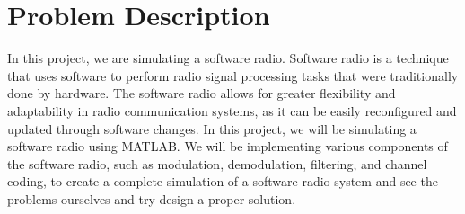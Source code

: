 \chapter[Problem Description]{Problem Description}
\label{cp:problem-description}
In this project, we are simulating a software radio. Software radio is a technique that uses software to perform radio signal processing tasks that were traditionally done by hardware. The software radio allows for greater flexibility and adaptability in radio communication systems, as it can be easily reconfigured and updated through software changes.
 In this project, we will be simulating a software radio using MATLAB.
 We will be implementing various components of the software radio, such as modulation, demodulation, filtering, and channel coding, to create a complete simulation of a software radio system and see the problems ourselves and try design a proper solution.



\vspace{1cm}

